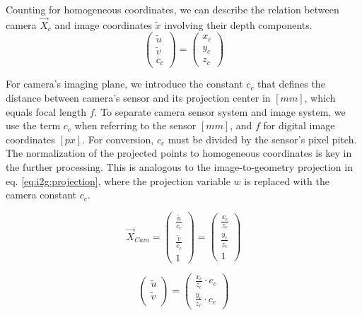 \documentclass[review]{elsarticle}
\begin{document}
Counting for homogeneous coordinates, we can describe the relation between camera $\vec{X}_c$ and image coordinates $\tilde{x}$ involving their depth components. 
\begin{equation}
\begin{pmatrix}
\tilde{u} \\
\tilde{v} \\
c_c
\end{pmatrix} =
\begin{pmatrix}
x_c \\
y_c \\
z_c
\end{pmatrix}
\end{equation}

For camera's imaging plane, we introduce the constant $c_c$ that defines the distance between camera's sensor and its projection center in $[mm]$, which equals focal length $f$. To separate camera sensor system and image system, we use the term $c_c$ when referring to the sensor $[mm]$, and $f$ for digital image coordinates $[px]$. For conversion, $c_c$ must be divided by the sensor's pixel pitch. The normalization of the projected points to homogeneous coordinates is key in the further processing. This is analogous to the image-to-geometry projection in eq. \ref{eq:i2g:projection}, where the projection variable $w$ is replaced with the camera constant $c_c$.

\begin{equation}
\vec{X}_{Cam} =
\begin{pmatrix}
\frac{\tilde{u}}{c_c} \\
\frac{\tilde{v}}{c_c} \\
1
\end{pmatrix} = \begin{pmatrix}
\frac{x_c}{z_c} \\
\frac{y_c}{z_c} \\
1
\end{pmatrix}
\end{equation}

\begin{equation}
\begin{pmatrix}
\tilde{u}\\
\tilde{v}\\
\end{pmatrix}
= \begin{pmatrix}
\frac{x_c}{z_c} \cdot c_c \\
\frac{y_c}{z_c}\cdot c_c
\end{pmatrix}
\label{eq:ut_vt}
\end{equation}
\end{document}

